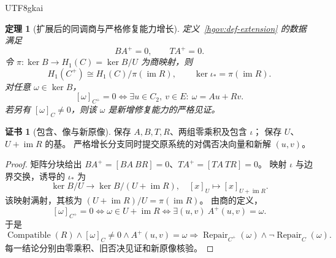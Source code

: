 \documentclass[12pt,a4paper,openany,notitlepage]{report}
\theoremstyle{plain}
\newtheorem{theorem}{定理}[chapter]
\theoremstyle{definition}
\newtheorem*{certificate}{证书}
\theoremstyle{remark}
\begin{document}
\begin{CJK*}{UTF8}{gkai}
\begin{theorem}[扩展后的同调商与严格修复能力增长]
\label{hgov:thm-extension}
定义~\ref{hgov:def-extension} 的数据满足
\[
 BA^+=0,\qquad TA^+=0.
\]
令 $\pi:\ker B\to H_1(C)=\ker B/U$ 为商映射，则
\[
 H_1(C^+)\cong
 H_1(C)\big/\pi(\operatorname{im}R),
 \qquad
 \ker\iota_*=\pi(\operatorname{im}R).
\]
对任意 $\omega\in\ker B$，
\[
 [\omega]_{C^+}=0
 \Longleftrightarrow
 \exists u\in C_2,\ v\in E:\ \omega=Au+Rv.
\]
若另有 $[\omega]_C\ne0$，则该 $\omega$ 是新增修复能力的严格见证。
\end{theorem}
\begin{certificate}[包含、像与新原像]
保存 $A,B,T,R$、两组零乘积及包含 $\iota$；
保存 $U$、$U+\operatorname{im}R$ 的基。
严格增长分支同时提交原系统的对偶否决向量和新解 $(u,v)$。
\end{certificate}
\begin{proof}
矩阵分块给出
$BA^+=[BA\ BR]=0$、$TA^+=[TA\ TR]=0$。
映射 $\iota$ 与边界交换，诱导的 $\iota_*$ 为
\[
 \ker B/U\longrightarrow\ker B/(U+\operatorname{im}R),
 \quad [x]_U\longmapsto[x]_{U+\operatorname{im}R}.
\]
该映射满射，其核为
$(U+\operatorname{im}R)/U=\pi(\operatorname{im}R)$。
由商的定义，
\[
 [\omega]_{C^+}=0
 \Longleftrightarrow
 \omega\in U+\operatorname{im}R
 \Longleftrightarrow
 \exists(u,v)\ A^+(u,v)=\omega.
\]
于是
\[
 \operatorname{Compatible}(R)
 \wedge[\omega]_C\ne0
 \wedge A^+(u,v)=\omega
 \Longrightarrow
 \operatorname{Repair}_{C^+}(\omega)
 \wedge\neg\operatorname{Repair}_{C}(\omega).
\]
每一结论分别由零乘积、旧否决见证和新原像核验。
\end{proof}


\end{CJK*}
\end{document}

